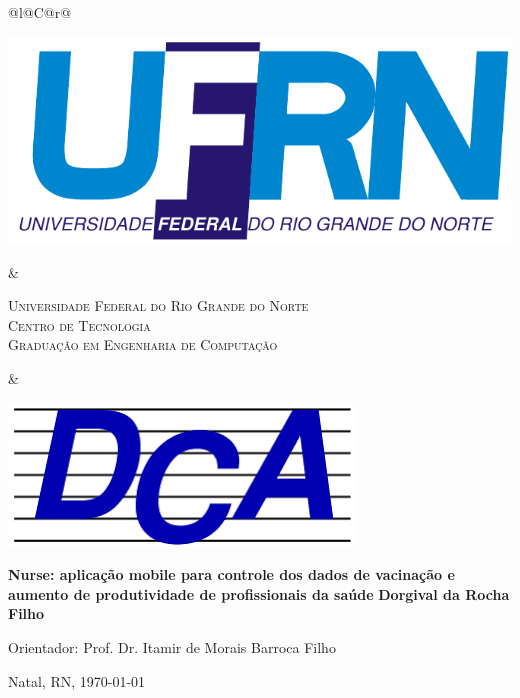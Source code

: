 %
%

\begin{titlepage}

\begin{center}

\small

\begin{tabularx}{\linewidth}{@{}l@{}C@{}r@{}}
\parbox[c]{3cm}{\includegraphics[width=\linewidth]{./figuras/UFRN}} &
\begin{center}
\textsf{\textsc{Universidade Federal do Rio Grande do Norte\\
Centro de Tecnologia\\
Graduação em Engenharia de Computação}}
\end{center} &
\parbox[c]{3cm}{\includegraphics[width=\linewidth]{./figuras/dca_logo.png}}
\end{tabularx}

\vfill
\LARGE
\textbf{Nurse: aplicação mobile para controle dos dados de vacinação e aumento de produtividade de profissionais da saúde}
\vfill
\Large
\textbf{Dorgival da Rocha Filho}
\vfill

\normalsize

Orientador: Prof. Dr. Itamir de Morais Barroca Filho

\vfill

\hfill


\vfill

\large

Natal, RN, \today

\end{center}

\end{titlepage}